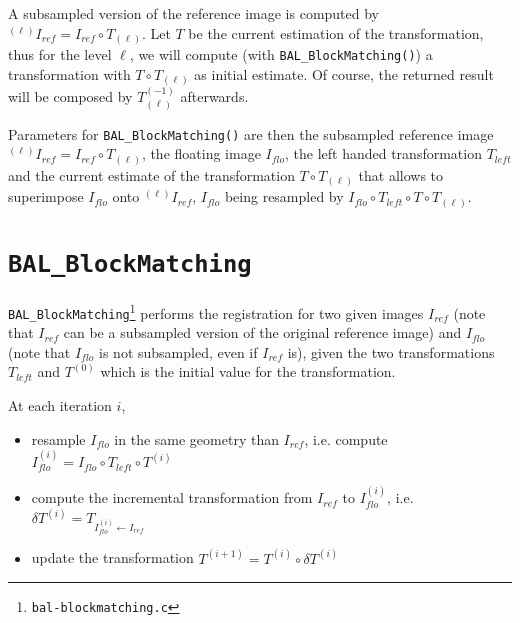 A subsampled version of the reference image is computed by
${}^{(\ell)}I_{ref} = I_{ref} \circ T_{(\ell)}$. 
Let $T$ be the current estimation of the transformation, thus for the
level $\ell$, we will compute (with \texttt{BAL\_BlockMatching()}) a transformation with $T \circ
T_{(\ell)}$ as initial estimate. Of course, the returned result will
be composed by $T_{(\ell)}^{(-1)}$ afterwards.

Parameters for \texttt{BAL\_BlockMatching()} are then the subsampled
reference image ${}^{(\ell)}I_{ref} = I_{ref} \circ T_{(\ell)}$, the
floating image $I_{flo}$, the left handed transformation $T_{left}$
and the current estimate of the transformation $T \circ
T_{(\ell)}$ that allows to superimpose $I_{flo}$ onto
${}^{(\ell)}I_{ref}$, $I_{flo}$ being resampled by  
$I_{flo} \circ T_{left} \circ T \circ T_{(\ell)}$.

\section{\texttt{BAL\_BlockMatching}}

\texttt{BAL\_BlockMatching}\footnote{\texttt{bal-blockmatching.c}}
performs the registration for two given images $I_{ref}$ (note that
$I_{ref}$ can be a subsampled version of the original reference image)
and $I_{flo}$ (note that $I_{flo}$ is not subsampled, even if
$I_{ref}$ is), given the two transformations $T_{left}$ and $T^{(0)}$ 
which is the initial value for the transformation.

At each iteration $i$,
\begin{itemize}
\item resample $I_{flo}$ in the same geometry than $I_{ref}$, i.e. compute $I_{flo}^{(i)} = I_{flo} \circ T_{left} \circ T^{(i)}$
\item compute the incremental transformation from $I_{ref}$ to $I_{flo}^{(i)}$,
  i.e. $\delta T^{(i)} = T_{ I_{flo}^{(i)} \leftarrow I_{ref}}$
\item update the transformation $T^{(i+1)} = T^{(i)} \circ \delta T^{(i)}$
\end{itemize}


